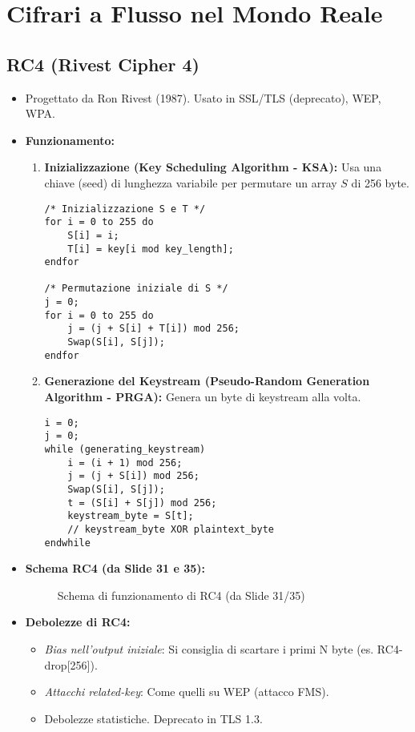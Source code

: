 \documentclass{article}
\begin{document}
\section{Cifrari a Flusso nel Mondo Reale}
\subsection{RC4 (Rivest Cipher 4)}
\begin{itemize}
    \item Progettato da Ron Rivest (1987). Usato in SSL/TLS (deprecato), WEP, WPA.
    \item \textbf{Funzionamento:}
    \begin{enumerate}
        \item \textbf{Inizializzazione (Key Scheduling Algorithm - KSA):}
        Usa una chiave (seed) di lunghezza variabile per permutare un array $S$ di 256 byte.
        \begin{verbatim}
/* Inizializzazione S e T */
for i = 0 to 255 do
    S[i] = i;
    T[i] = key[i mod key_length];
endfor

/* Permutazione iniziale di S */
j = 0;
for i = 0 to 255 do
    j = (j + S[i] + T[i]) mod 256;
    Swap(S[i], S[j]);
endfor
        \end{verbatim}
        \item \textbf{Generazione del Keystream (Pseudo-Random Generation Algorithm - PRGA):}
        Genera un byte di keystream alla volta.
        \begin{verbatim}
i = 0;
j = 0;
while (generating_keystream)
    i = (i + 1) mod 256;
    j = (j + S[i]) mod 256;
    Swap(S[i], S[j]);
    t = (S[i] + S[j]) mod 256;
    keystream_byte = S[t];
    // keystream_byte XOR plaintext_byte
endwhile
        \end{verbatim}
    \end{enumerate}
    \item \textbf{Schema RC4 (da Slide 31 e 35):}
    \begin{figure}[H]
        \centering
        \caption{Schema di funzionamento di RC4 (da Slide 31/35)}
    \end{figure}
    \item \textbf{Debolezze di RC4:}
    \begin{itemize}
        \item \textit{Bias nell'output iniziale}: Si consiglia di scartare i primi N byte (es. RC4-drop[256]).
        \item \textit{Attacchi related-key}: Come quelli su WEP (attacco FMS).
        \item Debolezze statistiche. Deprecato in TLS 1.3.
    \end{itemize}
\end{itemize}
\end{document}
